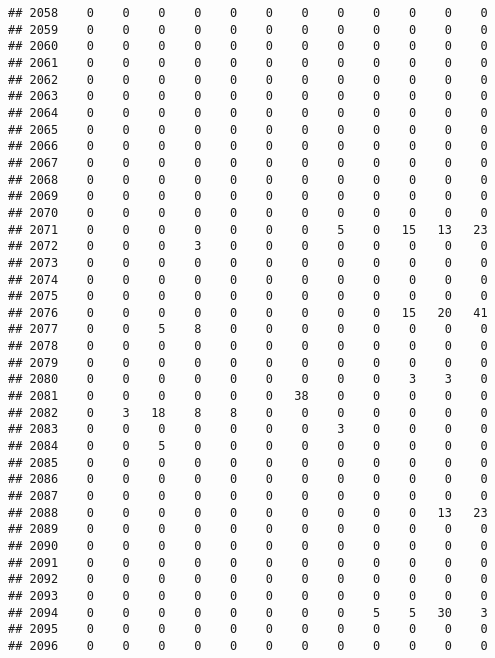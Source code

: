 \documentclass[]{article}
\begin{document}
\begin{verbatim}
## 2058    0    0    0    0    0    0    0    0    0    0    0    0
## 2059    0    0    0    0    0    0    0    0    0    0    0    0
## 2060    0    0    0    0    0    0    0    0    0    0    0    0
## 2061    0    0    0    0    0    0    0    0    0    0    0    0
## 2062    0    0    0    0    0    0    0    0    0    0    0    0
## 2063    0    0    0    0    0    0    0    0    0    0    0    0
## 2064    0    0    0    0    0    0    0    0    0    0    0    0
## 2065    0    0    0    0    0    0    0    0    0    0    0    0
## 2066    0    0    0    0    0    0    0    0    0    0    0    0
## 2067    0    0    0    0    0    0    0    0    0    0    0    0
## 2068    0    0    0    0    0    0    0    0    0    0    0    0
## 2069    0    0    0    0    0    0    0    0    0    0    0    0
## 2070    0    0    0    0    0    0    0    0    0    0    0    0
## 2071    0    0    0    0    0    0    0    5    0   15   13   23
## 2072    0    0    0    3    0    0    0    0    0    0    0    0
## 2073    0    0    0    0    0    0    0    0    0    0    0    0
## 2074    0    0    0    0    0    0    0    0    0    0    0    0
## 2075    0    0    0    0    0    0    0    0    0    0    0    0
## 2076    0    0    0    0    0    0    0    0    0   15   20   41
## 2077    0    0    5    8    0    0    0    0    0    0    0    0
## 2078    0    0    0    0    0    0    0    0    0    0    0    0
## 2079    0    0    0    0    0    0    0    0    0    0    0    0
## 2080    0    0    0    0    0    0    0    0    0    3    3    0
## 2081    0    0    0    0    0    0   38    0    0    0    0    0
## 2082    0    3   18    8    8    0    0    0    0    0    0    0
## 2083    0    0    0    0    0    0    0    3    0    0    0    0
## 2084    0    0    5    0    0    0    0    0    0    0    0    0
## 2085    0    0    0    0    0    0    0    0    0    0    0    0
## 2086    0    0    0    0    0    0    0    0    0    0    0    0
## 2087    0    0    0    0    0    0    0    0    0    0    0    0
## 2088    0    0    0    0    0    0    0    0    0    0   13   23
## 2089    0    0    0    0    0    0    0    0    0    0    0    0
## 2090    0    0    0    0    0    0    0    0    0    0    0    0
## 2091    0    0    0    0    0    0    0    0    0    0    0    0
## 2092    0    0    0    0    0    0    0    0    0    0    0    0
## 2093    0    0    0    0    0    0    0    0    0    0    0    0
## 2094    0    0    0    0    0    0    0    0    5    5   30    3
## 2095    0    0    0    0    0    0    0    0    0    0    0    0
## 2096    0    0    0    0    0    0    0    0    0    0    0    0

\end{verbatim}
\end{document}

